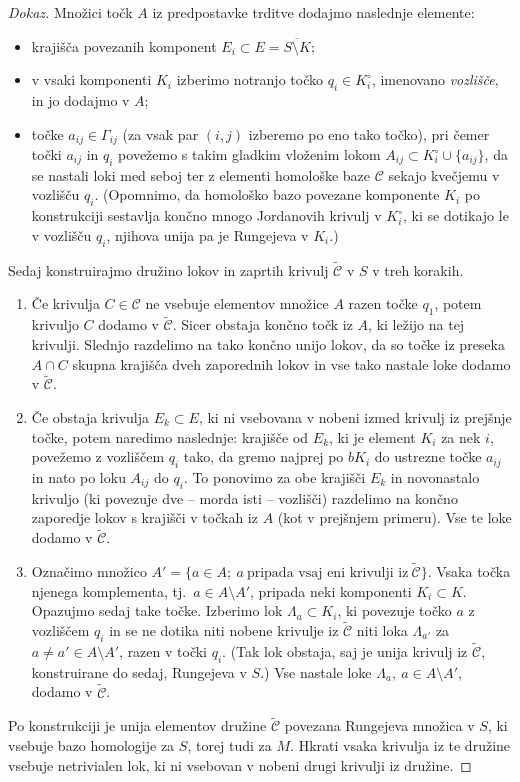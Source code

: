 \documentclass[12pt,a4paper,twoside]{article}
\theoremstyle{definition} %
\newenvironment{dokaz}[1][Dokaz]{\begin{proof}[#1]}{\end{proof}}
\theoremstyle{plain} %
\numberwithin{equation}{section}  %
\begin{document}
\begin{dokaz}
Množici točk $A$ iz predpostavke trditve dodajmo naslednje elemente:
\begin{itemize}
\item krajišča povezanih komponent $E_{i} \subset E = \overline{S \setminus K}$;
\item v vsaki komponenti $K_{i}$ izberimo notranjo točko $q_{i} \in K_{i}^{\circ}$, imenovano \emph{vozlišče}, in jo dodajmo v $A$;
\item točke $a_{ij} \in \Gamma_{ij}$ (za vsak par $(i,j)$ izberemo po eno tako točko), pri čemer točki $a_{ij}$ in $q_{i}$ povežemo s takim gladkim vloženim lokom $A_{ij} \subset K_{i}^{\circ} \cup \{a_{ij}\}$, da se nastali loki med seboj ter z elementi homološke baze $\mathcal{C}$ sekajo kvečjemu v vozlišču $q_{i}$. (Opomnimo, da homološko bazo povezane komponente $K_{i}$ po konstrukciji sestavlja končno mnogo Jordanovih krivulj v $K_{i}^{\circ}$, ki se dotikajo le v vozlišču $q_{i}$, njihova unija pa je Rungejeva v $K_{i}$.)
\end{itemize}
Sedaj konstruirajmo družino lokov in zaprtih krivulj $\widetilde{\mathcal{C}}$ v $S$ v treh korakih.
\begin{enumerate}
\item
	Če krivulja $C \in \mathcal{C}$ ne vsebuje elementov množice $A$ razen točke $q_{1}$, potem krivuljo $C$ dodamo v $\widetilde{\mathcal{C}}$.
	Sicer obstaja končno točk iz $A$, ki ležijo na tej krivulji. Slednjo razdelimo na tako končno unijo lokov, da so točke iz preseka $A \cap C$ skupna krajišča dveh zaporednih lokov in vse tako nastale loke dodamo v $\widetilde{\mathcal{C}}$.
\item
	Če obstaja krivulja $E_{k} \subset E$, ki ni vsebovana v nobeni izmed krivulj iz prejšnje točke, potem naredimo naslednje:
	krajišče od $E_{k}$, ki je element $K_{i}$ za nek $i$, povežemo z vozliščem $q_{i}$ tako, da gremo najprej po $bK_{i}$ do ustrezne točke $a_{ij}$ in nato po loku $A_{ij}$ do $q_{i}$. To ponovimo za obe krajišči $E_{k}$ in novonastalo krivuljo (ki povezuje dve -- morda isti -- vozlišči) razdelimo na končno zaporedje lokov s krajišči v točkah iz $A$ (kot v prejšnjem primeru). Vse te loke dodamo v $\widetilde{\mathcal{C}}$.
\item
	Označimo množico $A' = \{ a \in A; \ a \ \textrm{pripada vsaj eni krivulji iz} \ \widetilde{\mathcal{C}}\}$.
	Vsaka točka njenega komplementa, tj.~$a \in A \setminus A'$, pripada neki komponenti $K_{i} \subset K$. Opazujmo sedaj take točke.
	Izberimo lok $\Lambda_{a} \subset K_{i}$, ki povezuje točko $a$ z vozliščem $q_{i}$ in se ne dotika niti nobene krivulje iz $\widetilde{\mathcal{C}}$ niti loka $\Lambda_{a'}$ za $a \neq a' \in A \setminus A'$, razen v točki $q_{i}$. (Tak lok obstaja, saj je unija krivulj iz $\widetilde{\mathcal{C}}$, konstruirane do sedaj, Rungejeva v $S$.) Vse nastale loke $\Lambda_{a}, \ a \in A \setminus A'$, dodamo v $\widetilde{\mathcal{C}}$.
\end{enumerate}
Po konstrukciji je unija elementov družine $\widetilde{\mathcal{C}}$ povezana Rungejeva množica v $S$, ki vsebuje bazo homologije za $S$, torej tudi za $M$. Hkrati vsaka krivulja iz te družine vsebuje netrivialen lok, ki ni vsebovan v nobeni drugi krivulji iz družine. \newline


\end{dokaz}
\end{document}
